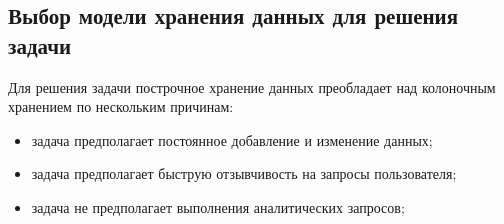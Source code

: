 \subsection{Выбор модели хранения данных для решения задачи}

Для решения задачи построчное хранение данных преобладает над колоночным хранением по нескольким причинам:

\begin{itemize}
    \item задача предполагает постоянное добавление и изменение данных;
    \item задача предполагает быструю отзывчивость на запросы пользователя;
    \item задача не предполагает выполнения аналитических запросов;
\end{itemize}

